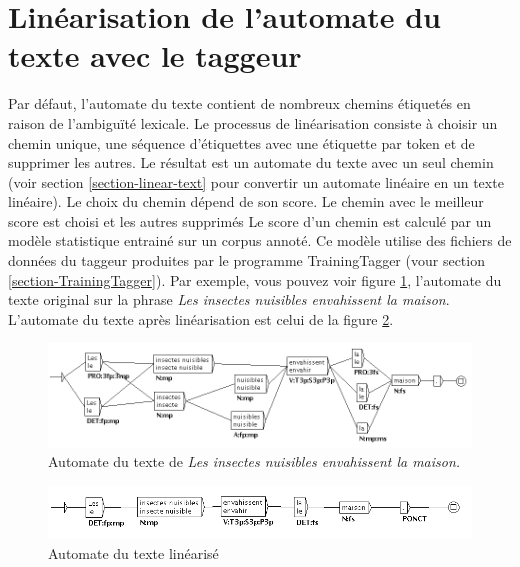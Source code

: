 \section{Linéarisation de l'automate du texte avec le taggeur}
\label{section-linearization}
Par défaut, l'automate du texte contient de nombreux chemins étiquetés en raison de l'ambiguïté
lexicale. Le processus de linéarisation consiste à choisir un chemin unique, une séquence
d'étiquettes avec une étiquette par token et de supprimer les autres. 
Le résultat est un automate du texte avec un seul chemin (voir section \ref{section-linear-text}
pour convertir un automate linéaire en un texte linéaire). Le choix du chemin dépend de son score.
Le chemin avec le meilleur score est choisi et les autres supprimés
Le score d'un chemin est calculé par un modèle statistique entrainé sur un corpus annoté.
Ce modèle utilise des fichiers de données du taggeur produites par le programme 
TrainingTagger (vour section \ref{section-TrainingTagger}). 
Par exemple, vous pouvez voir figure \ref{fig7-linearize2}, l'automate du texte original sur la
phrase \textit{Les insectes nuisibles envahissent la maison}. L'automate du texte après
linéarisation est celui de la figure \ref{fig7-linearize3}.

\begin{figure}[!ht]
\begin{center}
\includegraphics[width=16cm]{resources/img/fig7-linearize2.png}
\caption{Automate du texte de \textit{Les insectes nuisibles envahissent la maison.}\label{fig7-linearize2}}
\end{center}
\end{figure}

\begin{figure}[!ht]
\begin{center}
\includegraphics[width=16cm]{resources/img/fig7-linearize3.png}
\caption{Automate du texte linéarisé\label{fig7-linearize3}}
\end{center}
\end{figure}

